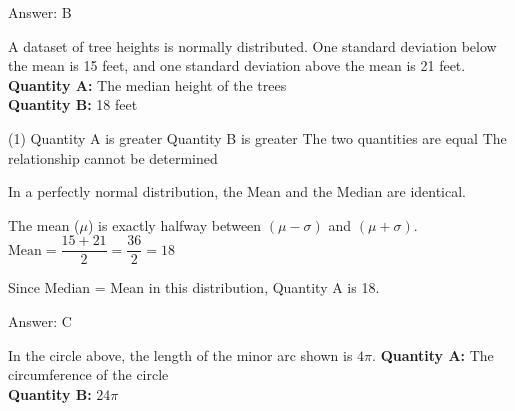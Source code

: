 \documentclass[11pt,paper=a4,answers]{exam}
\begin{document}
\begin{questions}
\begin{solution}
Answer: \colorbox{yellow!100}{B}
\end{solution}

\vspace{1cm}

\question
A dataset of tree heights is normally distributed. One standard deviation below the mean is 15 feet, and one standard deviation above the mean is 21 feet.
\vspace{5pt}
\textbf{Quantity A: } The median height of the trees \\
\vspace{5pt}
\textbf{Quantity B: } 18 feet

\begin{tasks}(1)
\task[A)] Quantity A is greater
\task[B)] Quantity B is greater
\task[C)] The two quantities are equal
\task[D)] The relationship cannot be determined
\end{tasks}

\begin{solution}
In a perfectly normal distribution, the Mean and the Median are identical.
\vspace{5pt}
\begin{center}
The mean ($\mu$) is exactly halfway between $(\mu - \sigma)$ and $(\mu + \sigma)$.
\vspace{5pt}
$\text{Mean} = \dfrac{15 + 21}{2} = \dfrac{36}{2} = 18$
\end{center}
\vspace{5pt}
Since Median = Mean in this distribution, Quantity A is 18.

Answer: \colorbox{yellow!100}{C}
\end{solution}

\vspace{1cm}

\question
\begin{center}
\end{center}
In the circle above, the length of the minor arc shown is $4\pi$.
\vspace{5pt}
\textbf{Quantity A: } The circumference of the circle \\
\vspace{5pt}
\textbf{Quantity B: } $24\pi$


\end{questions}
\end{document}
